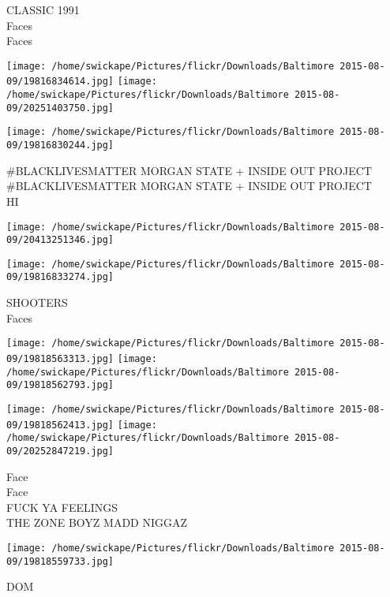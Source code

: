 \documentclass[10pt,letterpaper]{article}
\begin{document}
CLASSIC 1991\\
Faces\\
Faces\\
\pagebreak

\texttt{[image: /home/swickape/Pictures/flickr/Downloads/Baltimore 2015-08-09/19816834614.jpg]}
\texttt{[image: /home/swickape/Pictures/flickr/Downloads/Baltimore 2015-08-09/20251403750.jpg]}

\vspace{0.25in}
\texttt{[image: /home/swickape/Pictures/flickr/Downloads/Baltimore 2015-08-09/19816830244.jpg]}

\#BLACKLIVESMATTER MORGAN STATE + INSIDE OUT PROJECT\\
\#BLACKLIVESMATTER MORGAN STATE + INSIDE OUT PROJECT\\
HI\\
\pagebreak

\texttt{[image: /home/swickape/Pictures/flickr/Downloads/Baltimore 2015-08-09/20413251346.jpg]}

\vspace{0.25in}
\texttt{[image: /home/swickape/Pictures/flickr/Downloads/Baltimore 2015-08-09/19816833274.jpg]}

SHOOTERS\\
Faces\\
\pagebreak

\texttt{[image: /home/swickape/Pictures/flickr/Downloads/Baltimore 2015-08-09/19818563313.jpg]}
\texttt{[image: /home/swickape/Pictures/flickr/Downloads/Baltimore 2015-08-09/19818562793.jpg]}

\texttt{[image: /home/swickape/Pictures/flickr/Downloads/Baltimore 2015-08-09/19818562413.jpg]}
\texttt{[image: /home/swickape/Pictures/flickr/Downloads/Baltimore 2015-08-09/20252847219.jpg]}

Face\\
Face\\
FUCK YA FEELINGS\\
THE ZONE BOYZ MADD NIGGAZ\\
\pagebreak

\texttt{[image: /home/swickape/Pictures/flickr/Downloads/Baltimore 2015-08-09/19818559733.jpg]}

DOM\\
\pagebreak
\end{document}
